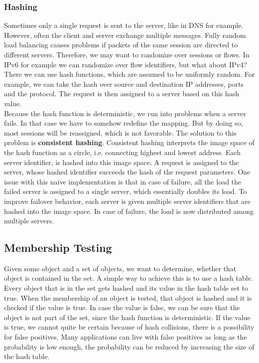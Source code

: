 \subsubsection{Hashing}
Sometimes only a single request is sent to the server, like in DNS for example. However, often the client and server exchange multiple messages. Fully random load balancing causes problems if packets of the same session are directed to different servers. Therefore, we may want to randomize over sessions or flows. In IPv6 for example we can randomize over flow identifiers, but what about IPv4? There we can use hash functions, which are assumed to be uniformly random. For example, we can take the hash over source and destination IP addresses, ports and the protocol. The request is then assigned to a server based on this hash value.\vspace{.3cm}\\

Because the hash function is deterministic, we run into problems when a server fails. In that case we have to somehow redefine the mapping. But by doing so, most sessions will be reassigned, which is not favorable. The solution to this problem is \textbf{consistent hashing}. Consistent hashing interprets the image space of the hash function as a circle, i.e. connecting highest and lowest address. Each server identifier, is hashed into this image space. A request is assigned to the server, whose hashed identifier succeeds the hash of the request parameters. One issue with this naive implementation is that in case of failure, all the load the failed server is assigned to a single server, which essentially doubles its load. To improve failover behavior, each server is given multiple server identifiers that are hashed into the image space. In case of failure, the load is now distributed among multiple servers.

\subsection{Membership Testing}
Given some object and a set of objects, we want to determine, whether that object is contained in the set. A simple way to achieve this is to use a hash table. Every object that is in the set gets hashed and its value in the hash table set to true. When the membership of an object is tested, that object is hashed and it is checked if the value is true. In case the value is false, we can be sure that the object is not part of the set, since the hash function is deterministic. If the value is true, we cannot quite be certain because of hash collisions, there is a possibility for false positives. Many applications can live with false positives as long as the probability is low enough, the probability can be reduced by increasing the size of the hash table. \vspace{.3cm}\\

